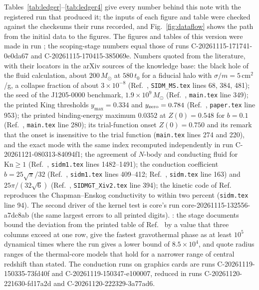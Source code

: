 \documentclass[aps,prd,twocolumn,10pt,superscriptaddress,nofootinbib,longbibliography,floatfix]{revtex4-2}
\newcommand{\Kn}{\mathrm{Kn}}
\begin{document}
Tables~\ref{tab:ledger}--\ref{tab:ledger4} give every number behind this note with the registered run that produced it; the inputs of each figure and table were checked against the checksums their runs recorded, and Fig.~\ref{fig:dataflow} shows the path from the initial data to the figures. The figures and tables of this version were made in run \texttt{\unskip}; the scoping-stage numbers equal those of runs C-20261115-171741-0e0da67 and C-20261115-170415-385069e. Numbers quoted from the literature, with their locators in the arXiv sources of the knowledge base: the black hole of the fluid calculation, about $200\,M_\odot$ at $580\,t_0$ for a fiducial halo with $\sigma/m=5\,$cm$^2$/g, a collapse fraction of about $3\times10^{-8}$ (Ref.~\cite{Gu:2026sidm}, \texttt{SIDM\_MS.tex} lines 68, 384, 481); the seed of the J1205-0000 benchmark, $1.9\times10^{9}\,M_\odot$ (Ref.~\cite{Feng:2021instab}, \texttt{main.tex} line 349); the printed King thresholds $y_{\max}=0.334$ and $y_{\rm zero}=0.784$ (Ref.~\cite{Gunther:2020ev}, \texttt{paper.tex} line 953); the printed binding-energy maximum $0.0352$ at $Z(0)=0.548$ for $b=0.1$ (Ref.~\cite{Feng:2021instab}, \texttt{main.tex} line 280); its trial-function onset $Z(0)=0.750$ and its remark that the onset is insensitive to the trial function (\texttt{main.tex} lines 274 and 220), and the exact mode with the same index recomputed independently in run C-20261121-080313-84094f1; the agreement of $N$-body and conducting fluid for $\Kn\ge1$ (Ref.~\cite{Koda:2011sidm}, \texttt{sidm1.tex} lines 1482--1491); the conduction coefficient $b=25\sqrt{\pi}/32$ (Ref.~\cite{Koda:2011sidm}, \texttt{sidm1.tex} lines 409--412; Ref.~\cite{Gurian:2025sidm}, \texttt{sidm.tex} line 163) and $25\pi/(32\sqrt6)$ (Ref.~\cite{Balberg:2002gt}, \texttt{SIDMGT\_Xiv2.tex} line 394); the kinetic code of Ref.~\cite{Gurian:2025sidm} reproduces the Chapman--Enskog conductivity to within two percent (\texttt{sidm.tex} line 94). The second driver of the kernel test is core's run core-20261115-132556-a7dc8ab (the same largest errors to all printed digits). \unskip: the stage documents bound the deviation from the printed table of Ref.~\cite{Feng:2021instab} by a value that three columns exceed at one row, give the fastest gravothermal phase as at least $10^5$ dynamical times where the run gives a lower bound of $8.5\times10^4$, and quote radius ranges of the thermal-core models that hold for a narrower range of central redshift than stated. The conduction runs on graphics cards are runs C-20261119-150335-73fd40f and C-20261119-150347-e100007, reduced in runs C-20261120-221630-fd17a2d and C-20261120-222329-3a77ad6.
\end{document}
